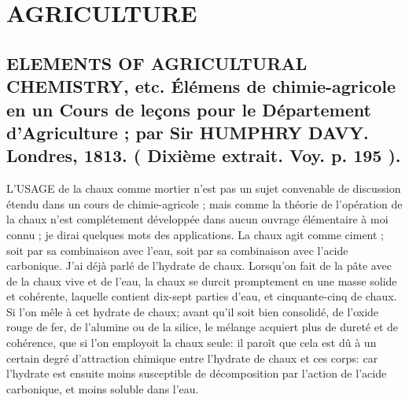 \setcounter{page}{229}
\chapter{AGRICULTURE}
\section{ELEMENTS OF AGRICULTURAL CHEMISTRY, etc. Élémens de chimie-agricole en un Cours de leçons pour le Département d'Agriculture ; par Sir HUMPHRY DAVY. Londres, 1813. \large{( Dixième extrait. Voy. p. 195 ).}}
L'USAGE de la chaux comme mortier n'est pas un sujet convenable de discussion étendu dans un cours de chimie-agricole ; mais comme la théorie de l'opération de la chaux n'est complétement développée dans aucun ouvrage élémentaire à moi connu ; je dirai quelques mots des applications.
La chaux agit comme ciment ; soit par sa combinaison avec l'eau, soit par sa combinaison avec l'acide carbonique.
J'ai déjà parlé de l'hydrate de chaux. Lorsqu'on fait de la pâte avec de la chaux vive et de l'eau, la chaux se durcit promptement en une masse solide et cohérente, laquelle contient dix-sept parties d'eau, et cinquante-cinq de chaux. Si l'on mêle à cet hydrate\setcounter{page}{230} de chaux; avant qu'il soit bien consolidé, de l'oxide rouge de fer, de l'alumine ou de la silice, le mélange acquiert plus de dureté et de cohérence, que si l'on employoit la chaux seule: il paroît que cela est dû à un certain degré d'attraction chimique entre l'hydrate de chaux et ces corps: car l'hydrate est ensuite moins susceptible de décomposition par l'action de l'acide carbonique, et moins soluble dans l'eau.
